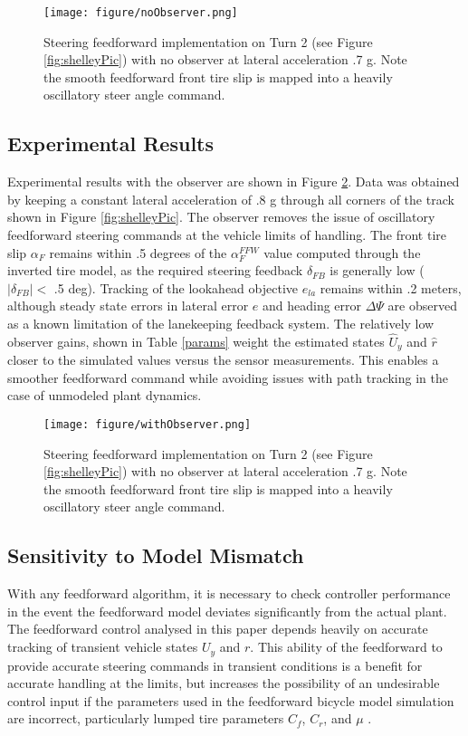 \documentclass[twocolumn,10pt]{asme2e}
\begin{document}
\begin{figure}
\centering
\texttt{[image: figure/noObserver.png]}
\caption{Steering feedforward implementation on Turn 2 (see Figure \ref{fig:shelleyPic}) with no observer at lateral acceleration .7 g. Note the smooth feedforward front tire slip is mapped into a heavily oscillatory steer angle command.}
\label{fig:noObserver}
\end{figure}

\subsection{Experimental Results}

Experimental results with the observer are shown in Figure \ref{fig:withObserver}. Data was obtained by keeping a constant lateral acceleration of .8 g through all corners of the track shown in Figure \ref{fig:shelleyPic}. 
The observer removes the issue of oscillatory feedforward steering commands at the vehicle limits of handling. The front tire slip $\alpha_F$ remains within .5 degrees of the $\alpha^{FFW}_F$ value
computed through the inverted tire model, as the required steering feedback $\delta_{FB}$ is generally low ($|\delta_{FB}| <$ .5 deg). Tracking of the lookahead objective $e_{la}$ remains within .2 meters, although steady
state errors in lateral error $e$ and heading error $\Delta\Psi$ are observed as a known limitation of the lanekeeping feedback system. The relatively low observer gains, shown in Table \ref{params} weight
the estimated states $\hat{U}_y$ and $\hat{r}$ closer to the simulated values versus the sensor measurements. This enables a smoother feedforward command while avoiding issues with path tracking in the case of unmodeled plant dynamics.

\begin{figure}
\centering
\texttt{[image: figure/withObserver.png]}
\caption{Steering feedforward implementation on Turn 2 (see Figure \ref{fig:shelleyPic}) with no observer at lateral acceleration .7 g. Note the smooth feedforward front tire slip is mapped into a heavily oscillatory steer angle command.}
\label{fig:withObserver}
\end{figure}

\subsection{Sensitivity to Model Mismatch}

With any feedforward algorithm, it is necessary to check controller performance in the event the feedforward model deviates significantly from the actual plant. The feedforward control 
analysed in this paper depends heavily on accurate tracking of transient vehicle states $U_y$ and $r$. This ability of the feedforward to provide accurate steering commands in transient conditions is a benefit for accurate handling at the 
limits, but increases the possibility of an undesirable control input if the  parameters used in the feedforward bicycle model simulation are incorrect, particularly lumped tire parameters $C_f$, $C_r$, and $\mu$ . 
\end{document}
